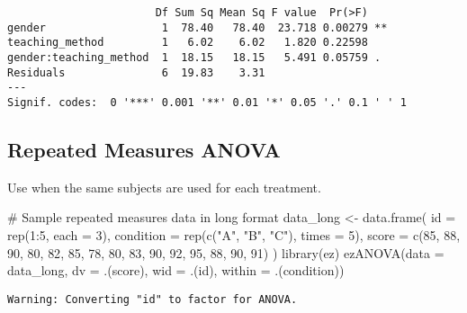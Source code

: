 \documentclass[
  letterpaper,
  DIV=11,
  numbers=noendperiod]{scrreprt}
\newenvironment{Shaded}{\begin{snugshade}}{\end{snugshade}}
\newcommand{\AttributeTok}[1]{\textcolor[rgb]{0.40,0.45,0.13}{#1}}
\newcommand{\CommentTok}[1]{\textcolor[rgb]{0.37,0.37,0.37}{#1}}
\newcommand{\DecValTok}[1]{\textcolor[rgb]{0.68,0.00,0.00}{#1}}
\newcommand{\FunctionTok}[1]{\textcolor[rgb]{0.28,0.35,0.67}{#1}}
\newcommand{\NormalTok}[1]{\textcolor[rgb]{0.00,0.23,0.31}{#1}}
\newcommand{\OtherTok}[1]{\textcolor[rgb]{0.00,0.23,0.31}{#1}}
\newcommand{\SpecialCharTok}[1]{\textcolor[rgb]{0.37,0.37,0.37}{#1}}
\newcommand{\StringTok}[1]{\textcolor[rgb]{0.13,0.47,0.30}{#1}}
\begin{document}
\begin{verbatim}
                       Df Sum Sq Mean Sq F value  Pr(>F)   
gender                  1  78.40   78.40  23.718 0.00279 **
teaching_method         1   6.02    6.02   1.820 0.22598   
gender:teaching_method  1  18.15   18.15   5.491 0.05759 . 
Residuals               6  19.83    3.31                   
---
Signif. codes:  0 '***' 0.001 '**' 0.01 '*' 0.05 '.' 0.1 ' ' 1
\end{verbatim}

\subsection{Repeated Measures ANOVA}\label{repeated-measures-anova}

Use when the same subjects are used for each treatment.

\begin{Shaded}
\begin{Highlighting}[]
\CommentTok{\# Sample repeated measures data in long format}
\NormalTok{data\_long }\OtherTok{\textless{}{-}} \FunctionTok{data.frame}\NormalTok{(}
  \AttributeTok{id =} \FunctionTok{rep}\NormalTok{(}\DecValTok{1}\SpecialCharTok{:}\DecValTok{5}\NormalTok{, }\AttributeTok{each =} \DecValTok{3}\NormalTok{),}
  \AttributeTok{condition =} \FunctionTok{rep}\NormalTok{(}\FunctionTok{c}\NormalTok{(}\StringTok{"A"}\NormalTok{, }\StringTok{"B"}\NormalTok{, }\StringTok{"C"}\NormalTok{), }\AttributeTok{times =} \DecValTok{5}\NormalTok{),}
  \AttributeTok{score =} \FunctionTok{c}\NormalTok{(}\DecValTok{85}\NormalTok{, }\DecValTok{88}\NormalTok{, }\DecValTok{90}\NormalTok{, }\DecValTok{80}\NormalTok{, }\DecValTok{82}\NormalTok{, }\DecValTok{85}\NormalTok{, }\DecValTok{78}\NormalTok{, }\DecValTok{80}\NormalTok{, }\DecValTok{83}\NormalTok{, }\DecValTok{90}\NormalTok{, }\DecValTok{92}\NormalTok{, }\DecValTok{95}\NormalTok{, }\DecValTok{88}\NormalTok{, }\DecValTok{90}\NormalTok{, }\DecValTok{91}\NormalTok{)}
\NormalTok{)}
\FunctionTok{library}\NormalTok{(ez)}
\FunctionTok{ezANOVA}\NormalTok{(}\AttributeTok{data =}\NormalTok{ data\_long, }\AttributeTok{dv =}\NormalTok{ .(score), }\AttributeTok{wid =}\NormalTok{ .(id), }\AttributeTok{within =}\NormalTok{ .(condition))}
\end{Highlighting}
\end{Shaded}

\begin{verbatim}
Warning: Converting "id" to factor for ANOVA.
\end{verbatim}
\end{document}
